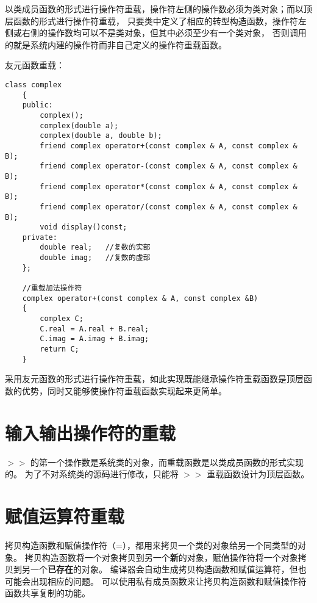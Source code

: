 \newpage

以类成员函数的形式进行操作符重载，操作符左侧的操作数必须为类对象；而以顶层函数的形式进行操作符重载，
只要类中定义了相应的转型构造函数，操作符左侧或右侧的操作数均可以不是类对象，但其中必须至少有一个类对象，
否则调用的就是系统内建的操作符而非自己定义的操作符重载函数。

\newpage

友元函数重载：
\begin{lstlisting}[frame=shadowbox]
    class complex
    {
    public:
        complex();
        complex(double a);
        complex(double a, double b);
        friend complex operator+(const complex & A, const complex & B);
        friend complex operator-(const complex & A, const complex & B);
        friend complex operator*(const complex & A, const complex & B);
        friend complex operator/(const complex & A, const complex & B);
        void display()const;
    private:
        double real;   //复数的实部
        double imag;   //复数的虚部
    };

    //重载加法操作符
    complex operator+(const complex & A, const complex &B)
    {
        complex C;
        C.real = A.real + B.real;
        C.imag = A.imag + B.imag;
        return C;
    }
\end{lstlisting}

\newpage

采用友元函数的形式进行操作符重载，如此实现既能继承操作符重载函数是顶层函数的优势，同时又能够使操作符重载函数实现起来更简单。

\newpage

\section{输入输出操作符的重载}

$>>$ 的第一个操作数是系统类的对象，而重载函数是以类成员函数的形式实现的。
为了不对系统类的源码进行修改，只能将 $>>$ 重载函数设计为顶层函数。

\section{赋值运算符重载}

拷贝构造函数和赋值操作符（=），都用来拷贝一个类的对象给另一个同类型的对象。
拷贝构造函数将一个对象拷贝到另一个\textbf{新}的对象，赋值操作符将一个对象拷贝到另一个\textbf{已存在}的对象。
编译器会自动生成拷贝构造函数和赋值运算符，但也可能会出现相应的问题。
可以使用私有成员函数来让拷贝构造函数和赋值操作符函数共享复制的功能。

